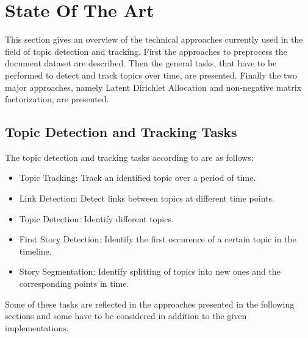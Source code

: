 
\section{State Of The Art}\label{sec:SOTA}

This section gives an overview of the technical approaches currently used in the field of topic detection and tracking. First the approaches to preprocess the document dataset are described. Then the general tasks, that have to be performed to detect and track topics over time, are presented. Finally the two major approaches, namely Latent Dirichlet Allocation and non-negative matrix factorization, are presented.



\subsection{Topic Detection and Tracking Tasks}\label{sec:TDT}
The topic detection and tracking tasks according to \cite{Fiscus:2002:TDT:772260.772263} are as follows:
\begin{itemize}
	\item Topic Tracking: Track an identified topic over a period of time.
	\item Link Detection: Detect links between topics at different time points.
	\item Topic Detection: Identify different topics.
	\item First Story Detection: Identify the first occurence of a certain topic in the timeline.
	\item Story Segmentation: Identify splitting of topics into new ones and the corresponding points in time.
\end{itemize}

Some of these tasks are reflected in the approaches presented in the following sections and some have to be considered in addition to the given implementations.



